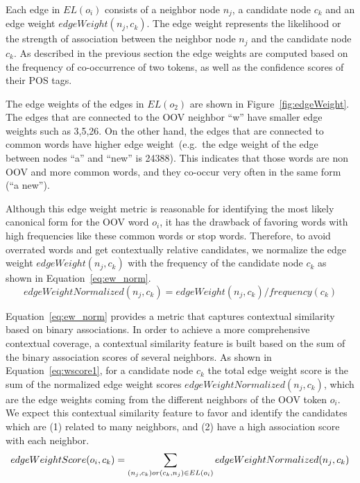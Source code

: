 \documentclass[a4paper,onesided,12pt]{report}
\begin{document}
Each edge in $EL(o_i)$ consists of a neighbor node $n_j$, a candidate node $c_k$ and an edge weight $edgeWeight(n_j,c_k)$. The edge weight represents the likelihood or the strength of association between the neighbor node $n_j$ and the candidate node $c_k$. As described in the previous section the edge weights are computed based on the frequency of co-occurrence of two tokens, as well as the confidence scores of their POS tags.

The edge weights of the edges in $EL(o_2)$ are shown in Figure~\ref{fig:edgeWeight}. The edges that are connected to the OOV neighbor ``w'' have smaller edge weights such as 3,5,26. On the other hand, the edges that are connected to common words have higher edge weight~(e.g.~the edge weight of the edge between nodes ``a'' and ``new'' is 24388). This indicates that those words are non OOV and more common words, and they co-occur very often in the same form (``a new'').

Although this edge weight metric is reasonable for identifying the most likely canonical form for the OOV word $o_i$, it has the drawback of favoring words with high frequencies like these common words or stop words. Therefore, to avoid overrated words and get contextually relative candidates, we normalize the edge weight $edgeWeight(n_j,c_k)$ with the frequency of the candidate node $c_k$ as shown in Equation~\ref{eq:ew_norm}.
\begin{equation}
edgeWeightNormalized(n_j,c_k) = edgeWeight(n_j,c_k) / frequency(c_k)
\label{eq:ew_norm}
\end{equation}

Equation~\ref{eq:ew_norm} provides a metric that captures contextual similarity based on binary associations.
In order to achieve a more comprehensive contextual coverage, a contextual similarity feature is built based on the sum of the binary association scores of several neighbors. As shown in Equation~\ref{eq:wscore1}, for a candidate node $c_k$ the total edge weight score is the sum of the normalized edge weight scores $edgeWeightNormalized(n_j,c_k)$, which are the edge weights coming from the different neighbors of the OOV token $o_i$. We expect this contextual similarity feature to favor and identify the candidates which are (1) related to many neighbors, and (2) have a high association score with each neighbor.
\begin{equation}
edgeWeightScore(o_i,c_k) = \sum_{(n_j,c_k) or (c_k,n_j) \in EL(o_i)}{edgeWeightNormalized(n_j,c_k)} \\\\
\label{eq:wscore1}
\end{equation}
\end{document}
